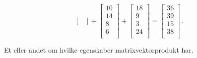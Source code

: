 \begin{eks}
$$\begin{bmatrix}
\end{bmatrix}
+
\begin{bmatrix}
10\\
14\\
8\\
6\\
\end{bmatrix}
+
\begin{bmatrix}
18\\
9\\
3\\
24\\
\end{bmatrix}
=
\begin{bmatrix}
36\\
39\\
15\\
38\\
\end{bmatrix}.
$$
\end{eks}
Et eller andet om hvilke egenskaber matrixvektorprodukt har.

